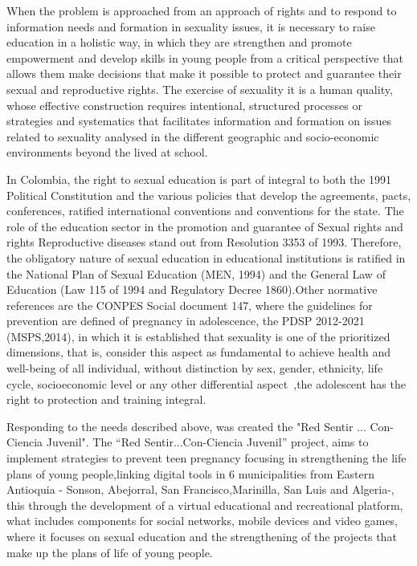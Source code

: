 \documentclass[journal,transmag]{IEEEtran}
\begin{document}
When the problem is approached from an approach of rights and to respond to information needs and formation in sexuality issues, it is necessary to raise education in a holistic way, in which they are strengthen and promote empowerment and develop skills in young people from a critical perspective that allows them make decisions that make it possible to protect and guarantee their sexual and reproductive rights. The exercise of sexuality it is a human quality, whose effective construction requires intentional, structured processes or strategies and systematics that facilitates information and formation on issues related to sexuality analysed in the different geographic and socio-economic environments beyond the lived at school.

In Colombia, the right to sexual education is part of integral to both the 1991 Political Constitution and the various policies that develop the agreements, pacts, conferences, ratified international conventions and conventions for the state. The role of the education sector in the promotion and guarantee of Sexual rights and rights Reproductive diseases stand out from Resolution 3353 of 1993. Therefore, the obligatory nature of sexual education in educational institutions is ratified in the National Plan of Sexual Education (MEN, 1994) and the General Law of Education (Law 115 of 1994 and Regulatory Decree 1860).Other normative references are the CONPES Social document 147, where the guidelines for prevention are defined of pregnancy in adolescence, the PDSP 2012-2021 (MSPS,2014), in which it is established that sexuality is one of the prioritized dimensions, that is, consider this aspect as fundamental to achieve health and well-being of all individual, without distinction by sex, gender, ethnicity, life cycle, socioeconomic level or any other differential aspect~\cite{Pro2015II},the adolescent has the right to protection and training integral.

Responding to the needs described above, was created the "Red Sentir ... Con-Ciencia Juvenil". The ``Red Sentir...Con-Ciencia Juvenil'' project, aims to implement strategies to prevent teen pregnancy focusing in strengthening the life plans of young people,linking digital tools in 6 municipalities from Eastern Antioquia - Sonson, Abejorral, San Francisco,Marinilla, San Luis and Algeria-, this through the development of a virtual educational and recreational platform, what includes components for social networks, mobile devices and video games, where it focuses on sexual education and the strengthening of the projects that make up the plans of life of young people.
\end{document}
